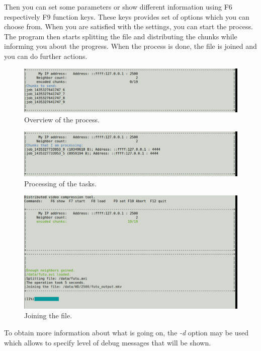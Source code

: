 Then you can set some parameters or show different information using F6
respectively F9 function keys. These keys provides set of options which
you can choose from. When you are satisfied with the settings, you can
start the process. The program then starts splitting the file and
distributing the chunks while informing you about the progress. When the
process is done, the file is joined and you can do further actions.

\begin{figure}[h]
\begin{center}
\includegraphics[scale=0.35]{./img/process-initiator.pdf}
\caption{Overview of the process.}
\end{center}
\end{figure}

\begin{figure}[h]
\begin{center}
\includegraphics[scale=0.35]{./img/processing.pdf}
\caption{Processing of the tasks.}
\end{center}
\end{figure}

\begin{figure}[h]
\begin{center}
\includegraphics[scale=0.35]{./img/joining.pdf}
\caption{Joining the file.}
\end{center}
\end{figure}

To obtain more information about what is going on, the \textit{-d}
option may be used which allows to specify level of debug messages that
will be shown.
